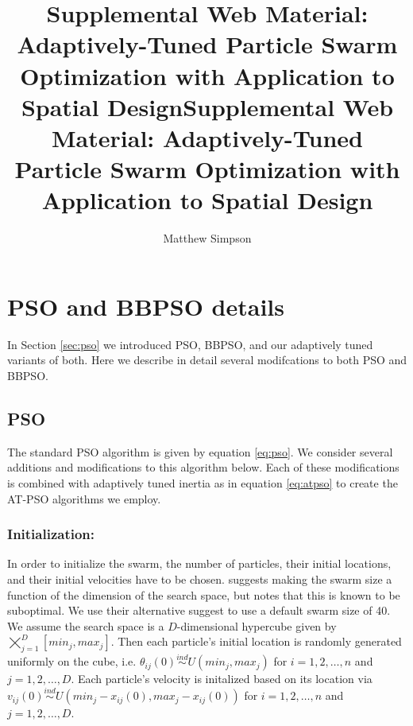 \documentclass[cmbright]{staauth}
\begin{document}
\blind
{
  \title{Supplemental Web Material: Adaptively-Tuned Particle Swarm Optimization with Application to Spatial Design}
  \author{Matthew Simpson}
  \address{Department of Statistics, University of Missouri,\\
    146 Middlebush Hall, Columbia, MO 65211-6100}
  \received{}
  \accepted{}

}\fi
{}\blind
{
  \title{Supplemental Web Material: Adaptively-Tuned Particle Swarm Optimization with Application to Spatial Design}
  \author{}
  \address{}
  \corremail{}
  \received{}
  \accepted{}

}\fi

\maketitle

\appendix
\section{PSO and BBPSO details}\label{app:psodetail}

In Section \ref{sec:pso} we introduced PSO, BBPSO, and our adaptively tuned variants of both. Here we describe in detail several modifcations to both PSO and BBPSO.

\subsection{PSO}\label{subapp:pso}
The standard PSO algorithm is given by equation \eqref{eq:pso}. We consider several additions and modifications to this algorithm below. Each of these modifications is combined with adaptively tuned inertia as in equation \eqref{eq:atpso} to create the AT-PSO algorithms we employ.

\subsubsection{Initialization:}
In order to initialize the swarm, the number of particles, their initial locations, and their initial velocities have to be chosen. \citet{clerc2011spso} suggests making the swarm size a function of the dimension of the search space, but notes that this is known to be suboptimal. We use their alternative suggest to use a default swarm size of 40. We assume the search space is a $D$-dimensional hypercube given by $\bigtimes_{j=1}^D[min_j, max_j]$. Then each particle's initial location is randomly generated uniformly on the cube, i.e. $\theta_{ij}(0)\stackrel{ind}{\sim}U(min_j, max_j)$ for $i=1,2,\dots,n$ and $j=1,2,\dots,D$. Each particle's velocity is initalized based on its location via  $v_{ij}(0)\stackrel{ind}{\sim}U(min_j - x_{ij}(0), max_j - x_{ij}(0))$ for $i=1,2,\dots,n$ and $j=1,2,\dots,D$.
\end{document}
